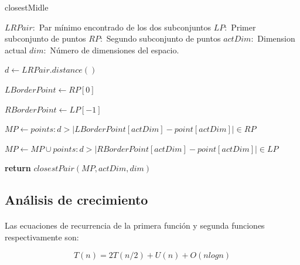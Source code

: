\documentclass{article}
\newcommand\abs[1]{\left|#1\right|}
\begin{document}
		
		\begin{algorithm}[H]

			\caption{closestMidle}

			\label{closestMidle}

			\begin{algorithmic}[1] %

				\State $LRPair:$ Par mínimo encontrado de los dos subconjuntos
				\State $LP:$ Primer subconjunto de puntos
				\State $RP:$ Segundo subconjunto de puntos
				\State $actDim:$ Dimension actual
				\State $dim:$ Número de dimensiones del espacio.
				\State

			
				\State $d \gets LRPair.distance()$

				\State $LBorderPoint \gets RP[0]$

				\State $RBorderPoint \gets LP[-1]$

				\State
				
				\State $MP \gets points: d > \abs{LBorderPoint[actDim] - point[actDim]} \in RP$

				\State $MP \gets MP \cup points:  d > \abs{RBorderPoint[actDim] - point[actDim]} \in LP$

				\State	
								
				\State \textbf{return} $closestPair(MP, actDim, dim)$


			\EndProcedure

			\end{algorithmic}

		\end{algorithm}

	\subsection{Análisis de crecimiento}
	
		\paragraph{}
		Las ecuaciones de recurrencia de la primera función y segunda funciones respectivamente son:
	
		\begin{equation}
		T(n) =  2T(n/2) + U(n) + O(nlogn)
		\end{equation}
		
\end{document}
